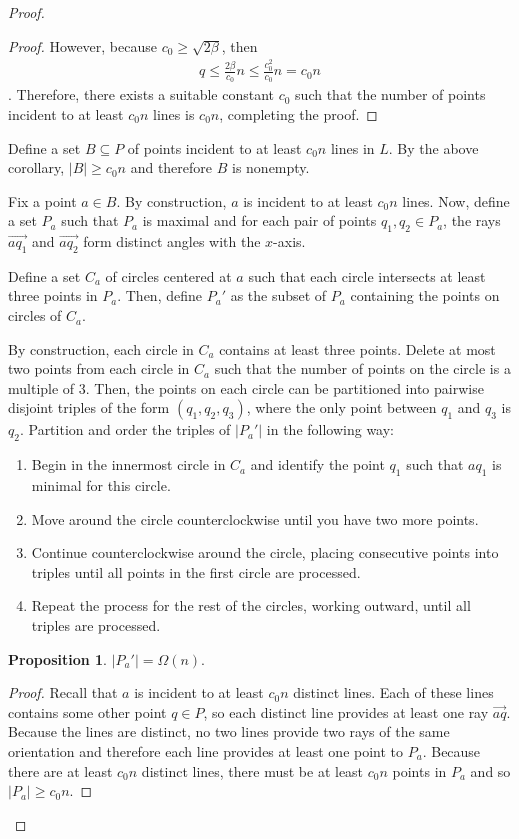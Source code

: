 \documentclass{scrippsthesisclass}
\theoremstyle{definition}
\newtheorem{proposition}[theorem]{Proposition}
\begin{document}
\begin{proof}
\begin{proof}
However, because $c_0 \geq \sqrt{2\beta}$, then
\begin{align}
q \leq \frac{2\beta}{c_0} n \leq \frac{c_0^2}{c_0}n = c_0n
\end{align}.
Therefore, there exists a suitable constant $c_0$ such that the number of points incident to at least $c_0 n$ lines is $c_0n$, completing the proof. 
\end{proof}

Define a set $B \subseteq P$ of points incident to at least $c_0 n$ lines in $L$. 
By the above corollary, $|B| \geq c_0 n$ and therefore $B$ is nonempty. 

Fix a point $a \in B$. 
By construction, $a$ is incident to at least $c_0 n$ lines. 
Now, define a set $P_a$ such that $P_a$ is maximal and for each pair of points $q_1, q_2 \in P_a$, the rays $\overrightarrow{aq_1}$ and $\overrightarrow{aq_2}$ form distinct angles with the $x$-axis. 

Define a set $C_a$ of circles centered at $a$ such that each circle intersects at least three points in $P_a$. Then, define $P_a'$ as the subset of $P_a$ containing the points on circles of $C_a$. 

By construction, each circle in $C_a$ contains at least three points. 
Delete at most two points from each circle in $C_a$ such that the number of points on the circle is a multiple of $3$. 
Then, the points on each circle can be partitioned into pairwise disjoint triples of the form $(q_1, q_2, q_3)$, where the only point between $q_1$ and $q_3$ is $q_2$.
Partition and order the triples of $|P_a'|$ in the following way:
\begin{enumerate}
    \item Begin in the innermost circle in $C_a$ and identify the point $q_1$ such that $aq_1$ is minimal for this circle. 
    \item Move around the circle counterclockwise until you have two more points.
    \item Continue counterclockwise around the circle, placing consecutive points into triples until all points in the first circle are processed.
    \item Repeat the process for the rest of the circles, working outward, until all triples are processed. 
\end{enumerate}

\begin{proposition}
    $|P_a'| = \Omega(n)$. 
\end{proposition}
\begin{proof}
   Recall that $a$ is incident to at least $c_0 n$ distinct lines. 
    Each of these lines contains some other point $q \in P$, so each distinct line provides at least one ray $\overrightarrow{aq}$.
    Because the lines are distinct, no two lines provide two rays of the same orientation and therefore each line provides at least one point to $P_a$.
    Because there are at least $c_0 n$ distinct lines, there must be at least $c_0 n$ points in $P_a$ and so $|P_a| \geq c_0n$. 


\end{proof}
\end{proof}
\end{document}
